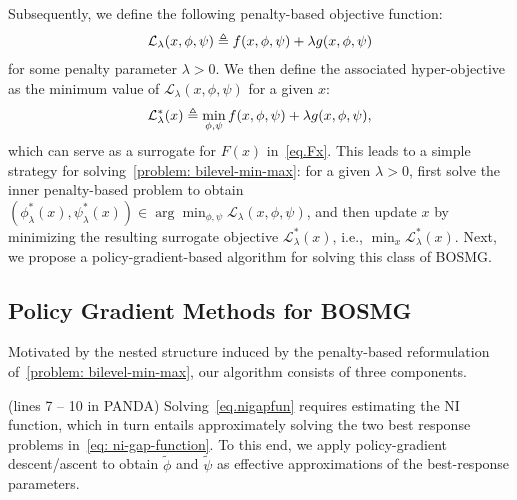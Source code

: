 \documentclass{article}
\theoremstyle{plain}
\theoremstyle{definition}
\theoremstyle{remark}
\def\bydef{\triangleq}
\begin{document}
Subsequently, we define the following penalty-based objective function:
\vspace{-1mm}
\begin{align}\label{eq.nigapfun}
    \mathcal{L}_\lambda(x,\phi,\psi) \bydef  f(x,\phi,\psi) + \lambda g(x,\phi,\psi)
    \vspace{-2mm}
\end{align}
for some penalty parameter $\lambda>0$. We then define the associated hyper-objective as the minimum value of $\mathcal{L}_\lambda(x,\phi,\psi)$ for a given $x$:
\vspace{-2mm}
\begin{align}
    \mathcal{L}_\lambda^*(x) \bydef \min_{\phi,\psi}   f(x,\phi,\psi) + \lambda g(x,\phi,\psi),
    \vspace{-2mm}
\end{align}
which can serve as a surrogate for $F(x)$ in~\eqref{eq.Fx}. This leads to a simple strategy for solving~\eqref{problem: bilevel-min-max}: for a given $\lambda>0$, first solve the inner penalty-based problem to obtain $(\phi^*_\lambda(x),\psi^*_\lambda(x)) \in \arg\min_{\phi,\psi} \mathcal{L}_\lambda(x,\phi,\psi)$, and then update $x$ by minimizing the resulting surrogate objective $\mathcal{L}_\lambda^*(x)$, i.e., $\min_x \mathcal{L}_\lambda^*(x)$. Next, we propose a policy-gradient-based algorithm for solving this class of BOSMG.

\vspace{-2mm}
\subsection{Policy Gradient Methods for BOSMG}
\label{sec: algorithm-design}
\vspace{-2mm}
Motivated by the nested structure induced by the penalty-based reformulation of~\eqref{problem: bilevel-min-max}, our algorithm consists of three components.

 (lines 7 -- 10 in PANDA) Solving~\eqref{eq.nigapfun} requires estimating the NI function, which in turn entails approximately solving the two best response problems in~\eqref{eq: ni-gap-function}. To this end, we apply policy-gradient descent/ascent to obtain $\tilde{\phi}$ and $\tilde{\psi}$ as effective approximations of the best-response parameters.
\end{document}
